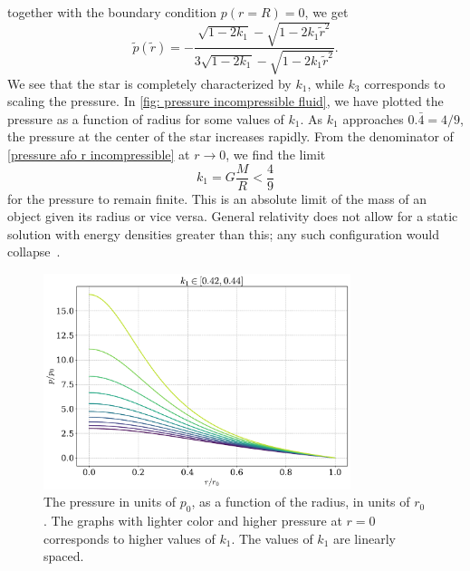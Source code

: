 %
together with the boundary condition $p(r = R) = 0$, we get 
%
\begin{equation}
    \label{pressure afo r incompressible}
    \tilde p(\tilde r) 
    = 
    - \frac{\sqrt{1 - 2 k_1} - \sqrt{1 - 2 k_1 \tilde r^2}}
    {3 \sqrt{1 - 2 k_1 } - \sqrt{1 - 2 k_1 \tilde r^2}}.
\end{equation}
%
We see that the star is completely characterized by $k_1$, while $k_3$ corresponds to scaling the pressure.
In \autoref{fig: pressure incompressible fluid}, we have plotted the pressure as a function of radius for some values of $k_1$.
As $k_1$ approaches $0.\bar 4 = 4/9$, the pressure at the center of the star increases rapidly.
From the denominator of \autoref{pressure afo r incompressible} at $r\rightarrow 0$, we find the limit
%
\begin{equation}
    \label{mass radius constraint}
    k_1 = G \frac{M}{R} < \frac{4}{9}
\end{equation}
%
for the pressure to remain finite.
This is an absolute limit of the mass of an object given its radius or vice versa.
General relativity does not allow for a static solution with energy densities greater than this; any such configuration would collapse~\autocite{carrollSpacetimeGeometryIntroduction2019}.


\begin{figure}[h]
    \centering
    \includegraphics[width=0.8\textwidth]{../scripts/figurer/incompressible.pdf}
    \caption{The pressure in units of $p_0$, as a function of the radius, in units of $r_0$. The graphs with lighter color and higher pressure at $r = 0$ corresponds to higher values of $k_1$. The values of $k_1$ are linearly spaced.}
    \label{fig: pressure incompressible fluid}
\end{figure}

